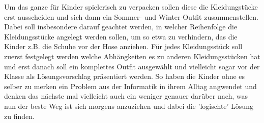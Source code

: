 Um das ganze für Kinder spielerisch zu verpacken sollen diese die Kleidungstücke erst ausscheiden und sich dann ein Sommer- und Winter-Outfit zusammenstellen. Dabei soll insbesondere darauf geachtet werden, in welcher Reihenfolge die Kleidungsstücke angelegt werden sollen, um so etwa zu verhindern, das die Kinder z.B. die Schuhe vor der Hose anziehen. Für jedes Kleidungsstück soll zuerst festgelegt werden welche Abhängkeiten es zu anderen Kleidungsstücken hat und erst danach soll ein komplettes Outfit ausgewählt und vielleicht sogar vor der Klasse als Lösungsvorschlag präsentiert werden. So haben die Kinder ohne es selber zu merken ein Problem aus der Informatik in ihrem Alltag angwendet und denken das nächste mal vielleicht auch ein weniger genauer darüber nach, was nun der beste Weg ist sich morgens anzuziehen und dabei die 'logischte' Lösung zu finden.